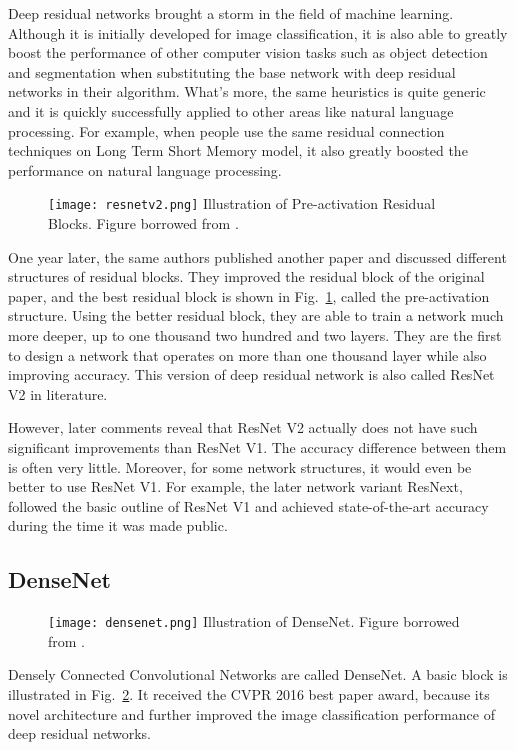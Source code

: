 Deep residual networks brought a storm in the field of machine learning. Although it is initially developed for image classification, it is also able to greatly boost the performance of other computer vision tasks such as object detection and segmentation when substituting the base network with deep residual networks in their algorithm. What's more, the same heuristics is quite generic and it is quickly successfully applied to other areas like natural language processing. For example, when people use the same residual connection techniques on Long Term Short Memory model, it also greatly boosted the performance on natural language processing.
\begin{figure}[!htp]
	\centering
	\texttt{[image: resnetv2.png]}
	{Illustration of Pre-activation Residual Blocks. Figure borrowed from \cite{he2016identity}.}
	\label{fig:resnetv2}
\end{figure}
One year later, the same authors published another paper\cite{he2016identity} and discussed different structures of residual blocks. They improved the residual block of the original paper, and the best residual block is shown in Fig.~\ref{fig:resnetv2}, called the pre-activation structure. Using the better residual block, they are able to train a network much more deeper, up to one thousand two hundred and two layers. They are the first to design a network that operates on more than one thousand layer while also improving accuracy. This version of deep residual network is also called ResNet V2 in literature. 

However, later comments reveal that ResNet V2 actually does not have such significant improvements than ResNet V1. The accuracy difference between them is often very little. Moreover, for some network structures, it would even be better to use ResNet V1. For example, the later network variant ResNext, followed the basic outline of ResNet V1 and achieved state-of-the-art accuracy during the time it was made public.

\subsection{DenseNet}
\begin{figure}[!htp]
	\centering
	\texttt{[image: densenet.png]}
	{Illustration of DenseNet. Figure borrowed from \cite{huang2017densely}.}
	\label{fig:densenet}
\end{figure}
Densely Connected Convolutional Networks\cite{huang2017densely} are called DenseNet. A basic block is illustrated in Fig.~\ref{fig:densenet}. It received the CVPR 2016 best paper award, because its novel architecture and further improved the image classification performance of deep residual networks.

